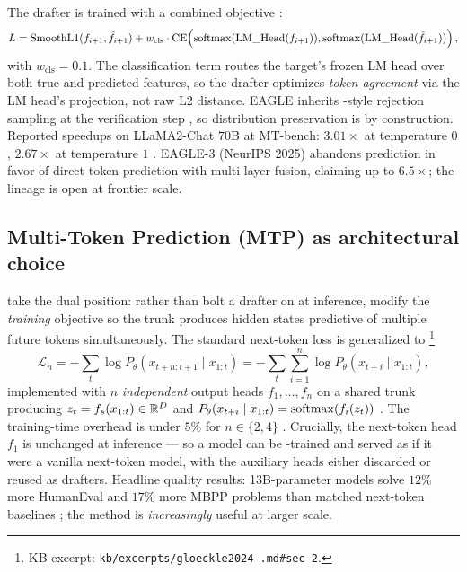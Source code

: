 The drafter is trained with a combined objective \citep[\S 3.2]{li2024-eagle}:
\begin{equation}
L = \operatorname{SmoothL1}(f_{i+1}, \hat f_{i+1}) + w_{\text{cls}} \cdot \operatorname{CE}\!\left(\operatorname{softmax}(\text{LM\_Head}(f_{i+1})), \operatorname{softmax}(\text{LM\_Head}(\hat f_{i+1}))\right),
\label{eq:eagle-loss}
\end{equation}
with $w_{\text{cls}} = 0.1$. The classification term routes the
target's frozen LM head over both true and predicted features, so the
drafter optimizes \emph{token agreement} via the LM head's projection,
not raw  L2 distance. EAGLE inherits -style rejection
sampling at the verification step \citep[\S 3.3]{li2024-eagle}, so
distribution preservation is by construction. Reported speedups on
LLaMA2-Chat 70B at MT-bench: $3.01\times$ at temperature $0$,
$2.67\times$ at temperature $1$ \citep[Fig.~1]{li2024-eagle}. EAGLE-3
\citep{eagle3-2025} (NeurIPS 2025) abandons  prediction in
favor of direct token prediction with multi-layer  fusion,
claiming up to $6.5\times$; the lineage is open at frontier scale.

\subsection{Multi-Token Prediction (MTP) as architectural choice}
\label{sec:mt-mtp}

\citet{gloeckle2024-mtp} take the dual position: rather than bolt a
drafter on at inference, modify the \emph{training} objective so the
trunk produces hidden states predictive of multiple future tokens
simultaneously. The standard next-token loss is generalized to
\citep[\S 2, Eq.~1]{gloeckle2024-mtp}\footnote{KB excerpt:
\texttt{kb/excerpts/gloeckle2024-.md\#sec-2}.}
\begin{equation}
\mathcal{L}_n = -\sum_t \log P_\theta(x_{t+n:t+1} \mid x_{1:t}) = -\sum_t \sum_{i=1}^{n} \log P_\theta(x_{t+i} \mid x_{1:t}),
\label{eq:mtp-loss}
\end{equation}
implemented with $n$ \emph{independent} output heads $f_1, \ldots,
f_n$ on a shared trunk producing $z_t = f_s(x_{1:t}) \in \mathbb{R}^D$ and
$P_\theta(x_{t+i} \mid x_{1:t}) = \operatorname{softmax}(f_i(z_t))$
\citep[\S 3]{gloeckle2024-mtp}. The training-time overhead is under
$5\%$ for $n \in \{2, 4\}$ \citep[\S 3]{gloeckle2024-mtp}.
Crucially, the next-token head $f_1$ is unchanged at inference --- so
a model can be -trained and served as if it were a vanilla
next-token model, with the auxiliary heads either discarded or reused
as drafters. Headline quality results: 13B-parameter  models solve
$12\%$ more HumanEval and $17\%$ more MBPP problems than matched
next-token baselines \citep[abstract]{gloeckle2024-mtp}; the method is
\emph{increasingly} useful at larger scale.

